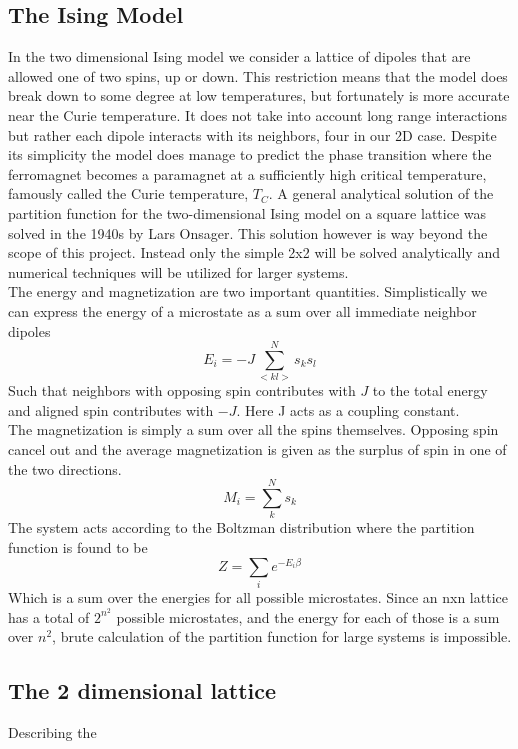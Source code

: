 \documentclass[a4paper, 12pt]{article}
\begin{document}
\subsection{The Ising Model}
	In the two dimensional Ising model we consider a lattice of dipoles that are allowed one of two spins, up or down. This restriction means that the model does break down to some degree at low temperatures, but fortunately is more accurate near the Curie temperature.\cite[p.~340]{schroeder} It does not take into account long range interactions but rather each dipole interacts with its neighbors, four in our 2D case. Despite its simplicity the model does manage to predict the phase transition where the ferromagnet becomes a paramagnet at a sufficiently high critical temperature, famously called the Curie temperature, $T_C$. A general analytical solution of the partition function for the two-dimensional Ising model on a square lattice was solved in the 1940s by Lars Onsager\cite[p.~343]{schroeder}. This solution however is way beyond the scope of this project. Instead only the simple 2x2 will be solved analytically and numerical techniques will be utilized for larger systems.\\
	The energy and magnetization are two important quantities. Simplistically we can express the energy of a microstate as a sum over all immediate neighbor dipoles
	\begin{equation}
		E_i = -J\sum_{<kl>}^N s_k s_l
	\end{equation}
	Such that neighbors with opposing spin contributes with $J$ to the total energy and aligned spin contributes with $-J$. Here J acts as a coupling constant.\\
	The magnetization is simply a sum over all the spins themselves. Opposing spin cancel out and the average magnetization is given as the surplus of spin in one of the two directions.
	\begin{equation}
		M_i = \sum_k^N s_k
	\end{equation}
	The system acts according to the Boltzman distribution where the partition function is found to be
	\begin{equation}
		Z = \sum_ie^{-E_i\beta}
	\end{equation}
	Which is a sum over the energies for all possible microstates. Since an nxn lattice has a total of $2^{n^2}$ possible microstates, and the  energy for each of those is a sum over $n^2$, brute calculation of the partition function for large systems is impossible. 
\subsection{The 2 dimensional lattice}
	Describing the 
\end{document}
